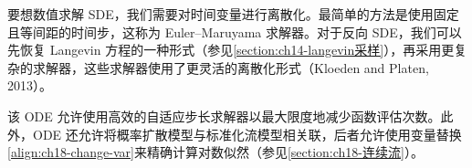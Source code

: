 \documentclass[../../main.tex]{subfiles}
\begin{document}
要想数值求解 SDE，我们需要对时间变量进行离散化。最简单的方法是使用固定且等间距的时间步，这称为 Euler--Maruyama 求解器。对于反向 SDE，我们可以先恢复 Langevin 方程的一种形式（参见\cref{section:ch14-langevin采样}），再采用更复杂的求解器，这些求解器使用了更灵活的离散化形式（Kloeden and Platen, 2013）。

该 ODE 允许使用高效的自适应步长求解器以最大限度地减少函数评估次数。此外，ODE 还允许将概率扩散模型与标准化流模型相关联，后者允许使用变量替换\eqref{align:ch18-change-var}来精确计算对数似然（参见\cref{section:ch18-连续流}）。
\end{document}
